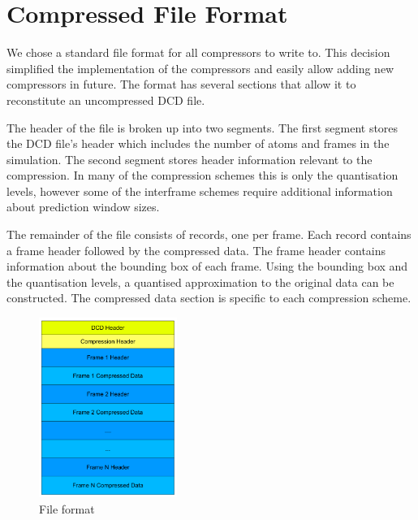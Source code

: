 \documentclass[a4paper,11pt]{report}
\begin{document}

\section{Compressed File Format}

We chose a standard file format for all compressors to write to. This decision simplified the implementation of the compressors and easily allow adding new compressors in future. The format has several sections that allow it to reconstitute an uncompressed DCD file.

The header of the file is broken up into two segments. The first segment stores the DCD file's header which includes the number of atoms and frames in the simulation. The second segment stores header information relevant to the compression. In many of the compression schemes this is only the quantisation levels, however some of the interframe schemes require additional information about prediction window sizes.

The remainder of the file consists of records, one per frame. Each record contains a frame header followed by the compressed data. The frame header contains information about the bounding box of each frame. Using the bounding box and the quantisation levels, a quantised approximation to the original data can be constructed. The compressed data section is specific to each compression scheme.

\begin{figure}
 \center
 \includegraphics[width=0.4\textwidth]{resources/FileFormat.png}
\caption{File format}
\label{fileformat}
\end{figure}

\end{document}
